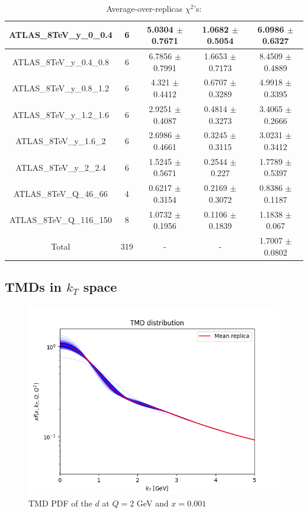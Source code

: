 \documentclass[
]{article}
\begin{document}
\begin{table}[h]
\begin{tabular}{|c|c|c|c|c|}
ATLAS\_8TeV\_y\_0\_0.4 & 6 & 5.0304 \(\pm\) 0.7671 & 1.0682 \(\pm\)
0.5054 & 6.0986 \(\pm\) 0.6327 \\ \hline
ATLAS\_8TeV\_y\_0.4\_0.8 & 6 & 6.7856 \(\pm\) 0.7991 & 1.6653 \(\pm\)
0.7173 & 8.4509 \(\pm\) 0.4889 \\ \hline
ATLAS\_8TeV\_y\_0.8\_1.2 & 6 & 4.321 \(\pm\) 0.4412 & 0.6707 \(\pm\)
0.3289 & 4.9918 \(\pm\) 0.3395 \\ \hline
ATLAS\_8TeV\_y\_1.2\_1.6 & 6 & 2.9251 \(\pm\) 0.4087 & 0.4814 \(\pm\)
0.3273 & 3.4065 \(\pm\) 0.2666 \\ \hline
ATLAS\_8TeV\_y\_1.6\_2 & 6 & 2.6986 \(\pm\) 0.4661 & 0.3245 \(\pm\)
0.3115 & 3.0231 \(\pm\) 0.3412 \\ \hline
ATLAS\_8TeV\_y\_2\_2.4 & 6 & 1.5245 \(\pm\) 0.5671 & 0.2544 \(\pm\)
0.227 & 1.7789 \(\pm\) 0.5397 \\ \hline
ATLAS\_8TeV\_Q\_46\_66 & 4 & 0.6217 \(\pm\) 0.3154 & 0.2169 \(\pm\)
0.3072 & 0.8386 \(\pm\) 0.1187 \\ \hline
ATLAS\_8TeV\_Q\_116\_150 & 8 & 1.0732 \(\pm\) 0.1956 & 0.1106 \(\pm\)
0.1839 & 1.1838 \(\pm\) 0.067 \\ \hline
Total & 319 & - & - & 1.7007 \(\pm\) 0.0802 \\ \hline

\end{tabular}

\caption{Average-over-replicas \(\chi^2\)'s:}

\end{table}

\hypertarget{tmds-in-k_t-space}{%
\subsection{\texorpdfstring{TMDs in \(k_T\)
space}{TMDs in k\_T space}}\label{tmds-in-k_t-space}}

\begin{figure}
\centering
\includegraphics{pngplots/tmd_1_2_0.001.png}
\caption{TMD PDF of the \(d\) at \(Q = 2\) GeV and \(x = 0.001\)}
\end{figure}
\end{document}
